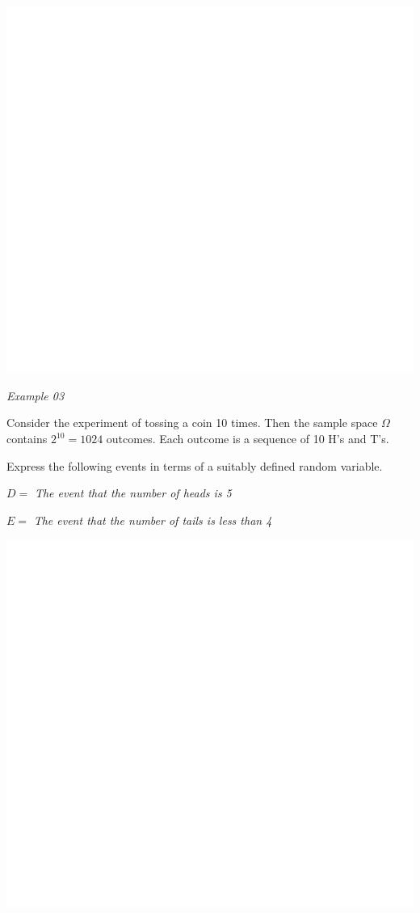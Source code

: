 \documentclass[]{book}
\begin{document}
\begin{center}\includegraphics[width=1\linewidth]{figure/Ch1box2-1} \end{center}

\newpage

\emph{Example 03}

Consider the experiment of tossing a coin 10 times. Then the sample space \(\Omega\) contains \(2^{10} = 1024\) outcomes. Each outcome is a sequence of 10 H's and T's.

Express the following events in terms of a suitably defined random variable.

\(D=\) \emph{The event that the number of heads is 5}

\(E=\) \emph{The event that the number of tails is less than 4}

\begin{center}\includegraphics[width=1\linewidth]{figure/Ch1box3-1} \end{center}
\end{document}
